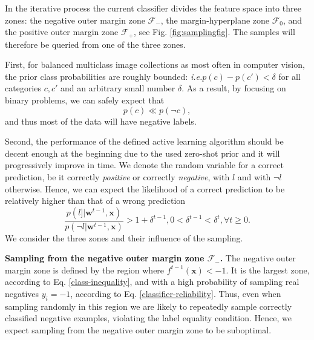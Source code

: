 \documentclass[10pt,twocolumn,letterpaper]{article}
\def\ie{\emph{i.e.}\xspace}
\newcommand{\mb}[1]{\bm #1}
\newcommand{\eqr}[1]{Eq. \eqref{#1}}
\begin{document}
In the iterative process the current classifier divides the feature space into three zones:
the negative outer margin zone $\mathcal{F}_-$, the margin-hyperplane zone $\mathcal{F}_0$, and the positive outer margin
zone $\mathcal{F}_+$, see Fig. \ref{fig:samplingfig}. The samples will therefore be queried from one of the three zones. 

First, for balanced multiclass image collections as most often in computer vision, the prior class probabilities 
are roughly bounded: \ie$p(c) - p(c') < \delta$ for all categories $c, c'$ and an arbitrary small number $\delta$. 
As a result, by focusing on binary problems, we can safely expect that 
\begin{equation}
p(c) \ll p(\neg c),
\label{class-inequality}
\end{equation}
and thus most of the data will have negative labels.

Second, the performance of the defined active learning algorithm should be decent enough at the beginning due to the used zero-shot prior and it will progressively improve in time. 
We denote the random variable for a correct prediction, be it correctly \emph{positive} or correctly \emph{negative}, with $l$ and with $\neg l$ otherwise. 
Hence, we can expect the likelihood of a correct prediction to  be relatively higher than that of a wrong prediction
\begin{equation}
\frac{p(l]| \mb{w}^{t-1}, \mb{x})}{p(\neg l|\mb{w}^{t-1}, \mb{x})} > 1+\delta^{t-1}, 0 < \delta^{t-1} < \delta^{t}, \forall t\geq0.
\label{classifier-reliability}
\end{equation}
We consider the three zones and their influence of the sampling.

\textbf{Sampling from the negative outer margin zone $\mathcal{F}_-$.} 
The negative outer margin zone is defined by the region where $f^{t-1}(\mb{x}) < -1$. %
It is the largest zone,  according to \eqr{class-inequality}, and with a high probability of sampling real negatives $y_i=-1$, according to \eqr{classifier-reliability}.
Thus, even when sampling randomly in this region we are likely to repeatedly sample correctly classified negative examples, violating the label equality condition. Hence, we expect sampling from the negative outer margin zone to be suboptimal.
\end{document}

